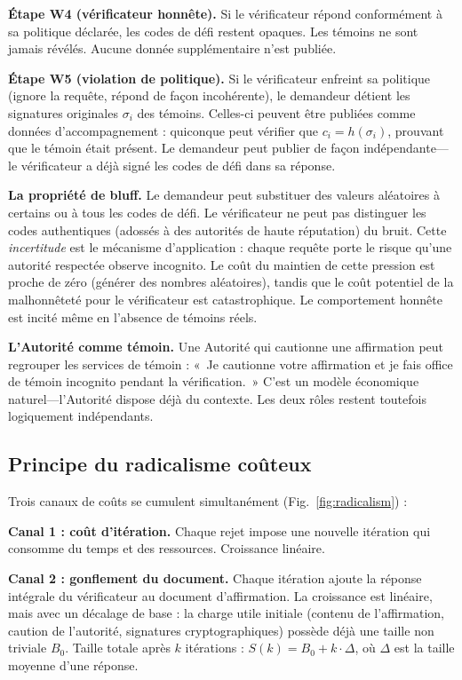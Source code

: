 \documentclass[11pt,a4paper,twocolumn]{article}
\begin{document}
\textbf{Étape W4 (vérificateur honnête).} Si le vérificateur répond conformément à sa politique déclarée, les codes de défi restent opaques. Les témoins ne sont jamais révélés. Aucune donnée supplémentaire n'est publiée.

\textbf{Étape W5 (violation de politique).} Si le vérificateur enfreint sa politique (ignore la requête, répond de façon incohérente), le demandeur détient les signatures originales $\sigma_i$ des témoins. Celles-ci peuvent être publiées comme données d'accompagnement : quiconque peut vérifier que $c_i = h(\sigma_i)$, prouvant que le témoin était présent. Le demandeur peut publier de façon indépendante---le vérificateur a déjà signé les codes de défi dans sa réponse.

\textbf{La propriété de bluff.} Le demandeur peut substituer des valeurs aléatoires à certains ou à tous les codes de défi. Le vérificateur ne peut pas distinguer les codes authentiques (adossés à des autorités de haute réputation) du bruit. Cette \emph{incertitude} est le mécanisme d'application : chaque requête porte le risque qu'une autorité respectée observe incognito. Le coût du maintien de cette pression est proche de zéro (générer des nombres aléatoires), tandis que le coût potentiel de la malhonnêteté pour le vérificateur est catastrophique. Le comportement honnête est incité même en l'absence de témoins réels.

\textbf{L'Autorité comme témoin.} Une Autorité qui cautionne une affirmation peut regrouper les services de témoin : «~Je cautionne votre affirmation et je fais office de témoin incognito pendant la vérification.~» C'est un modèle économique naturel---l'Autorité dispose déjà du contexte. Les deux rôles restent toutefois logiquement indépendants.

\subsection{Principe du radicalisme coûteux}

Trois canaux de coûts se cumulent simultanément (Fig.~\ref{fig:radicalism}) :

\textbf{Canal 1 : coût d'itération.} Chaque rejet impose une nouvelle itération qui consomme du temps et des ressources. Croissance linéaire.

\textbf{Canal 2 : gonflement du document.} Chaque itération ajoute la réponse intégrale du vérificateur au document d'affirmation. La croissance est linéaire, mais avec un décalage de base : la charge utile initiale (contenu de l'affirmation, caution de l'autorité, signatures cryptographiques) possède déjà une taille non triviale $B_0$. Taille totale après $k$ itérations : $S(k) = B_0 + k \cdot \Delta$, où $\Delta$ est la taille moyenne d'une réponse.
\end{document}
